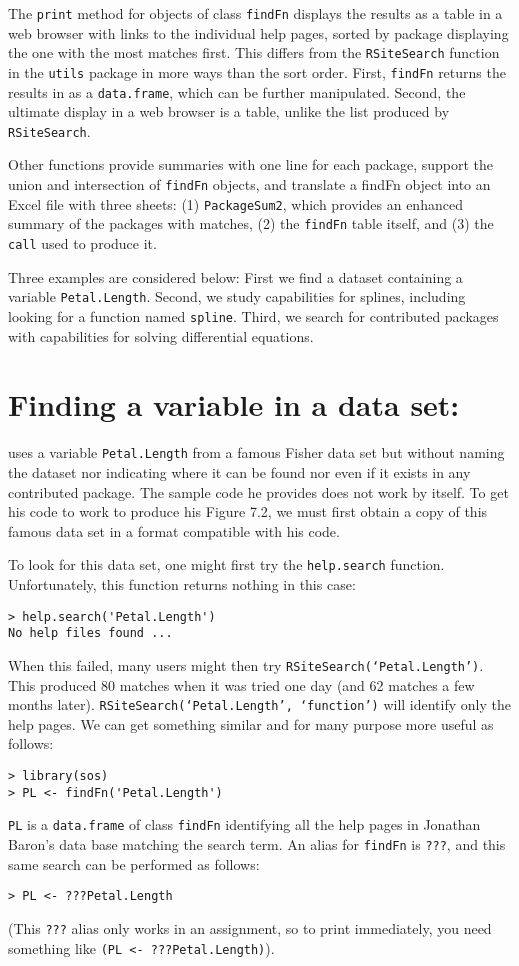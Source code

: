 The {\tt print} method for objects of class {\tt findFn}
displays the results as a table in a web
browser with links to the individual help pages, sorted by package
displaying the one with the most matches first.  This
differs from the {\tt RSiteSearch} function in the {\tt utils}
package in more ways than the sort
order.  First, {\tt findFn} returns
the results in \R{} as a {\tt data.frame}, which can be further
manipulated.  Second, the ultimate display in a web browser is a
table, unlike the list produced by {\tt RSiteSearch}.

Other  functions provide summaries with one line for each
package, support the union and intersection of {\tt findFn} objects,
and translate a findFn object into an Excel file with three sheets:  (1)
{\tt PackageSum2}, which provides an enhanced summary of the packages
with matches, (2) the {\tt findFn} table itself, and (3) the {\tt call}
used to produce it.

Three examples are considered below:  First we find a dataset
containing a variable {\tt Petal.Length}. Second, we study
\R{} capabilities for splines, including looking for a function
named {\tt spline}.  Third, we search for contributed \R{} packages
 with capabilities for solving differential equations.

\section{Finding a variable in a data set:  }

\citet[pp. 282-283]{JC09} uses a variable {\tt Petal.Length} from a
famous Fisher data set but without naming the dataset nor indicating
where it can be found nor even if it exists in any contributed \R{}
package.  The sample code he provides does not work by itself.  To get
his code to  work to produce his Figure 7.2, we must first obtain a
copy of this famous data set in a format compatible with his code.

To look for this data set, one might first try
the {\tt help.search} function.  Unfortunately, this function
returns nothing in this case:
\begin{verbatim}
> help.search('Petal.Length')
No help files found ...
\end{verbatim}
When this failed, many users might then try
{\tt RSiteSearch(`Petal.Length')}.  This produced 80 matches
when it was tried one day (and 62 matches a few months later).
{\tt RSiteSearch(`Petal.Length', `function')} will identify
only the help pages.  We can get something similar and for
many purpose more useful as follows:
\begin{verbatim}
> library(sos)
> PL <- findFn('Petal.Length')
\end{verbatim}
{\tt PL} is a {\tt data.frame} of class {\tt findFn} identifying
all the help pages in Jonathan Baron's data base matching the
search term.  An alias for {\tt findFn} is {\tt ???}, and this same
search can be performed as follows:
\begin{verbatim}
> PL <- ???Petal.Length
\end{verbatim}
(This {\tt ???} alias only works in an assignment, so to print
immediately, you need something like {\tt (PL <- ???Petal.Length)}).

